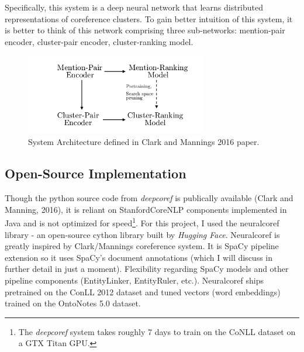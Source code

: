 \documentclass[11pt]{article}
\begin{document}
Specifically, this system is a deep neural network that learns distributed representations of coreference clusters. To gain better intuition of this system, it is better to think of this network comprising three sub-networks: mention-pair encoder, cluster-pair encoder, cluster-ranking model. \\

\begin{figure}[h]
\includegraphics[width=8cm]{deepneural}
\centering
\caption{System Architecture defined in Clark and Mannings 2016 paper.}
\end{figure}

\subsection{Open-Source Implementation}
Though the python source code from \textit{deepcoref} is publically available (Clark and Manning, 2016), it is reliant on StanfordCoreNLP components implemented in Java and is not optimized for speed\footnote{The \textit{deepcoref} system takes roughly 7 days to train on the CoNLL dataset on a GTX Titan GPU.}. For this project, I used the neuralcoref library - an open-source cython library built by \textit{Hugging Face}. Neuralcoref is greatly inspired by Clark/Mannings coreference system. It is SpaCy pipeline extension so it uses SpaCy’s document annotations (which I will discuss in further detail in just a moment). Flexibility regarding SpaCy models and other pipeline components (EntityLinker, EntityRuler, etc.). Neuralcoref ships pretrained on the ConLL 2012 dataset and tuned vectors (word embeddings) trained on the OntoNotes 5.0 dataset.
\end{document}
